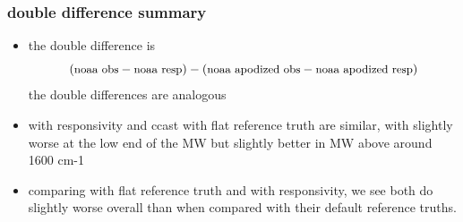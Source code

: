 \documentclass[11pt]{beamer}
\begin{document}
\begin{frame}
\frametitle{double difference summary}

\begin{itemize}

  \item the {\noaa} double difference is \[(\mbox{\small noaa obs} -
    \mbox{\small noaa resp}) - (\mbox{\small noaa apodized obs} -
    \mbox{\small noaa apodized resp})\]  
    the {\ccast} double differences are analogous

  \item {\noaa} with responsivity and ccast with flat reference
    truth are similar, with {\ccast} slightly worse at the low end
    of the MW but slightly better in MW above around 1600 cm-1

  \item comparing {\noaa} with flat reference truth and {\ccast}
    with responsivity, we see both do slightly worse overall than
    when compared with their default reference truths.

\end{itemize}

\end{frame}
\end{document}
